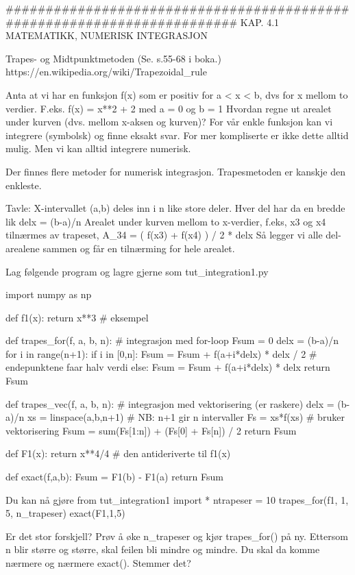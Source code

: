 ######################################################################## 
KAP. 4.1  MATEMATIKK, NUMERISK INTEGRASJON

Trapes- og Midtpunktmetoden
(Se. s.55-68 i boka.) 
https://en.wikipedia.org/wiki/Trapezoidal_rule 

Anta at vi har en funksjon f(x) som er positiv for a < x < b, dvs for x mellom to verdier.
F.eks. f(x) = x**2 + 2 med a = 0 og b = 1
Hvordan regne ut arealet under kurven (dvs. mellom x-aksen og kurven)?
For vår enkle funksjon kan vi integrere (symbolsk) og finne eksakt svar.
For mer kompliserte er ikke dette alltid mulig. 
Men vi kan alltid integrere numerisk. 

Der finnes flere metoder for numerisk integrasjon. 
Trapesmetoden er kanskje den enkleste. 

Tavle: 
X-intervallet (a,b) deles inn i n like store deler.
Hver del har da en bredde lik delx = (b-a)/n
Arealet under kurven mellom to x-verdier, f.eks, x3 og x4 tilnærmes av trapeset,
A_34 = ( f(x3) + f(x4) ) / 2 * delx
Så legger vi alle del-arealene sammen og får en tilnærming for hele arealet. 

Lag følgende program og lagre gjerne som tut_integration1.py 

import numpy as np

def f1(x):
    return x**3   # eksempel


def trapes_for(f, a, b, n):  # integrasjon med for-loop
    Fsum = 0
    delx = (b-a)/n
    for i in range(n+1):
        if i in [0,n]:
           Fsum = Fsum + f(a+i*delx) * delx / 2  # endepunktene faar halv verdi
        else: 
           Fsum = Fsum + f(a+i*delx) * delx
    return Fsum


def trapes_vec(f, a, b, n):  # integrasjon med vektorisering (er raskere)
    delx = (b-a)/n
    xs = linspace(a,b,n+1)   # NB: n+1 gir n intervaller
    Fs = xs*f(xs)   # bruker vektorisering
    Fsum = sum(Fs[1:n]) + (Fs[0] + Fs[n]) / 2
    return Fsum 


def F1(x):    
    return x**4/4    # den antideriverte til f1(x)

def exact(f,a,b):
    Fsum = F1(b) - F1(a)
    return Fsum



Du kan nå gjøre
from tut_integration1 import *
ntrapeser = 10
trapes_for(f1, 1, 5, n_trapeser)
exact(F1,1,5)

Er det stor forskjell?
Prøv å øke n_trapeser og kjør trapes_for() på ny. 
Ettersom n blir større og større, skal feilen bli mindre og mindre. 
Du skal da komme nærmere og nærmere exact(). 
Stemmer det? 



